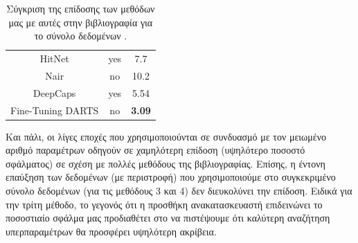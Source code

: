 \begin{table}[h]
\begin{center}
{\begin{tabular}{c c c}
            HitNet \cite{deliege2018_hitnet}& yes &7.7 \\
            Nair \cite{nair2021pushing_Nair}& no  & 10.2\\
            DeepCaps \cite{rajasegaran2019deepcaps}& yes & 5.54\\
            \midrule %
            Fine-Tuning DARTS\cite{tanveer2021fine} & no  & \textbf{3.09}\\
            \bottomrule
        \end{tabular}
        }
    \end{center}
    \caption[]{\label{tab:all_methods_comparison_fashionmnist}Σύγκριση της επίδοσης των μεθόδων μας με αυτές στην βιβλιογραφία για το σύνολο δεδομένων .} 
\end{table}

Και πάλι, οι λίγες εποχές που χρησιμοποιούνται σε συνδυασμό με τον μειωμένο αριθμό παραμέτρων οδηγούν σε χαμηλότερη επίδοση (υψηλότερο ποσοστό σφάλματος) σε σχέση με πολλές μεθόδους της βιβλιογραφίας. Επίσης, η έντονη επαύξηση των δεδομένων (με περιστροφή) που χρησιμοποιούμε στο συγκεκριμένο σύνολο δεδομένων (για τις μεθόδους 3 και 4) δεν διευκολύνει την επίδοση. Ειδικά για την τρίτη μέθοδο, το γεγονός ότι η προσθήκη ανακατασκευαστή επιδεινώνει το ποσοστιαίο σφάλμα μας προδιαθέτει στο να πιστέψουμε ότι καλύτερη αναζήτηση υπερπαραμέτρων θα προσφέρει υψηλότερη ακρίβεια.
\enlargethispage{\baselineskip}
